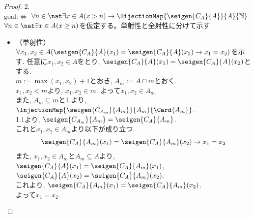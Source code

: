 \begin{proof} 2. \\
 goal:$\Leftrightarrow$ $\forall n \in \nat \exists x \in A(x > n) \rightarrow \BijectionMap{\seigen{C_A}{A}}{A}{\mathbb{N}} $\\
$\forall n \in \nat \exists x \in A(x \geq n)$を仮定する。単射性と全射性に分けて示す.
\begin{itemize}
    \item[]\hspace{-0.5cm} （単射性）
        $\forall x_1, x_2 \in A (\seigen {C_A}{A}(x_1) =  \seigen {C_A}{A}(x_2) \rightarrow x_1 = x_2)$を示す.
        任意に$x_1, x_2 \in A$をとり,
        $\seigen {C_A}{A}(x_1) = \seigen{C_A}{A}(x_2)$とする.\\
        $m:= \operatorname{max}(x_1, x_2) + 1$とおき,
        $A_m := A \cap m$とおく.\\
        $x_1, x_2 < m$より,
        $x_1, x_2 \in m$.
        よって$x_1, x_2 \in A_m$\\
        また,
        $A_m \subseteq m$と1.より,
        $\InjectionMap{\seigen {C_{A_m}}{A_m}}{A_m}{\Card{A_m}}$.\\
        1.1より,
        $\seigen {C_{A_m}}{A_m} = \seigen {C_A}{A_m}$.\\
        これと$x_1, x_2 \in A_m$より以下が成り立つ.
        \begin{equation*}
        \seigen{C_A}{A_m}(x_1) = \seigen{C_A}{A_m}(x_2) \rightarrow x_1 = x_2
        \end{equation*}
        また,
        $x_1, x_2 \in A_m$と$A_m \subseteq A$より,
        $\seigen{C_A}{A}(x_1) = \seigen{C_A}{A_m}(x_1)$,
        $\seigen{C_A}{A}(x_2) = \seigen{C_A}{A_m}(x_2).$\\
        これより,
        $\seigen{C_A}{A_m}(x_1) = \seigen{C_A}{A_m}(x_2)$.\\
        よって$x_1 = x_2$.


\end{itemize}
\end{proof}
